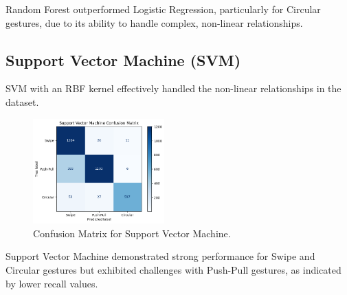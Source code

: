 \documentclass[10pt,twocolumn,letterpaper]{article}
\begin{document}
Random Forest outperformed Logistic Regression, particularly for Circular gestures, due to its ability to handle complex, non-linear relationships.

\subsection{Support Vector Machine (SVM)}

SVM with an RBF kernel effectively handled the non-linear relationships in the dataset.

\begin{table}[h]
\small
\begin{center}
\caption{Performance Metrics for Support Vector Machine}
\vspace{0.1cm}
\end{center}
\end{table}

\begin{figure}[h]
  \centering
  \includegraphics[width=0.45\textwidth]{figures/confusion_matrix_svm.png}
  \caption{Confusion Matrix for Support Vector Machine.}
  \label{fig:confusion_matrix_svm}
\end{figure}

Support Vector Machine demonstrated strong performance for Swipe and Circular gestures but exhibited challenges with Push-Pull gestures, as indicated by lower recall values.
\end{document}
